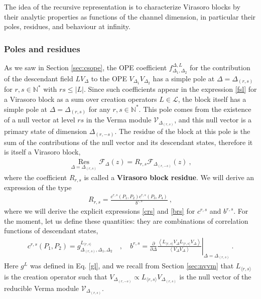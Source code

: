 \documentclass[12pt, a4paper]{article}
\newcommand{\myindex}[1]{\textbf{\boldmath #1}}
\theoremstyle{break}
\begin{document}
The idea of the recursive representation is to characterize Virasoro blocks by their analytic properties as functions of the channel dimension, in particular their poles, residues, and behaviour at infinity. 

\subsubsection{Poles and residues}

As we saw in Section \ref{sec:csope}, 
the OPE coefficient $f^{\Delta, L}_{\Delta_1,\Delta_2}$ for the contribution of the descendant field $LV_\Delta$ to the OPE $V_{\Delta_1}V_{\Delta_2}$ 
has a simple pole at $\Delta=\Delta_{(r,s)}$ for $r,s\in\mathbb{N}^*$ with $rs\leq |L|$. 
Since such coefficients appear in the expression \eqref{fsl} for a Virasoro block as a sum over creation operators $L\in\mathcal{L}$, 
the block itself has a simple pole at $\Delta=\Delta_{(r,s)}$ for any $r,s\in\mathbb{N}^*$. This pole comes from the existence of a null vector at level $rs$ in the Verma module $\mathcal{V}_{\Delta_{(r,s)}}$, and this null vector is a primary state of dimension $\Delta_{(r,-s)}$. The residue of the block at this pole is the sum of the contributions of the null vector and its descendant states, therefore it is itself a Virasoro block,
\begin{align}
 \boxed{\underset{\Delta=\Delta_{(r,s)}}{\operatorname{Res}} \mathcal{F}_\Delta(z) = R_{r,s}\mathcal{F}_{\Delta_{(r,-s)}}(z)}\ ,
 \label{resf}
\end{align}
where the coefficient $R_{r,s}$ is called a \myindex{Virasoro block residue}. We will derive an expression of the type 
\begin{align}
\boxed{R_{r,s} = \frac{c^{r,s}(P_1,P_2)c^{r,s}(P_3,P_4)}{b^{r,s}}}\ , 
 \label{rrs}
\end{align}
where we will derive the explicit expressions \eqref{crs} and \eqref{brs} for $c^{r,s}$ and $b^{r,s}$.
For the moment, let us define these quantities: they are combinations of correlation functions of descendant states, 
\begin{align}
 c^{r,s}(P_1,P_2) = g^{L_{\langle r,s\rangle}}_{\Delta_{(r,s)},\Delta_1,\Delta_2} \quad , \quad b^{r,s} =\left.\frac{\partial}{\partial \Delta} \frac{\left<L_{\langle r,s\rangle} V_\Delta L_{\langle r,s\rangle} V_\Delta \right>}{\left<V_\Delta V_\Delta\right>}\right|_{\Delta=\Delta_{(r,s)}}\ . 
\end{align}
Here $g^L$ was defined in Eq. \eqref{gl}, and we recall from Section \ref{sec:nvvm} that $L_{\langle r,s\rangle}$ is the creation operator such that $V_{\Delta_{(r,-s)}}\propto L_{\langle r,s\rangle}V_{\Delta_{(r,s)}}$ is the null vector of the reducible Verma module $\mathcal{V}_{\Delta_{(r,s)}}$. 
\end{document}
